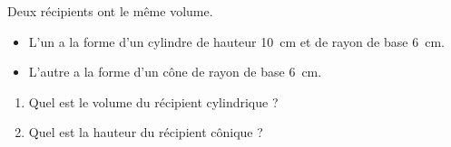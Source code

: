 \begin{Exo}
Deux récipients ont le même volume.
\begin{itemize}
\item L'un a la forme d'un cylindre de hauteur 10~cm et de rayon de base 6~cm.
\item L'autre a la forme d'un cône de rayon de base 6~cm.
\end{itemize}
\begin{enumerate}
\item Quel est le volume du récipient cylindrique ?
\item Quel est la hauteur du récipient cônique ?
\end{enumerate}
\end{Exo} 

